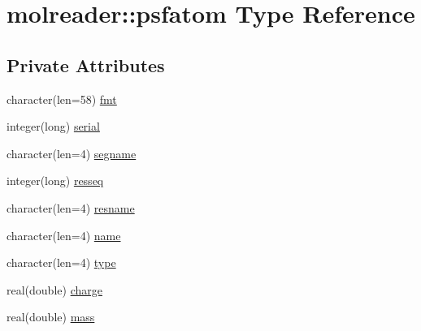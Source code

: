 \hypertarget{structmolreader_1_1psfatom}{\section{molreader\-:\-:psfatom Type Reference}
\label{structmolreader_1_1psfatom}
}
\subsection*{Private Attributes}
\begin{DoxyCompactItemize}
\item 
character(len=58) \hyperlink{structmolreader_1_1psfatom_a2c662eb006fdf85c624b28a08f65cc7b}{fmt}
\item 
integer(long) \hyperlink{structmolreader_1_1psfatom_ab524e29eb9ad1beb802719121a639fa0}{serial}
\item 
character(len=4) \hyperlink{structmolreader_1_1psfatom_aed960b86c5ddd5378e5a849a2732f650}{segname}
\item 
integer(long) \hyperlink{structmolreader_1_1psfatom_abb34c7f3cc664d0e63be1fc695413f7a}{resseq}
\item 
character(len=4) \hyperlink{structmolreader_1_1psfatom_a0bd7d6afb5d4c41d84a1e278d341ec00}{resname}
\item 
character(len=4) \hyperlink{structmolreader_1_1psfatom_a5f7ded307db07f842d21aee2dfca772b}{name}
\item 
character(len=4) \hyperlink{structmolreader_1_1psfatom_a99d2104c1a01026eef2cd329fd546f90}{type}
\item 
real(double) \hyperlink{structmolreader_1_1psfatom_abbebc3b397af2ee56c04933bc3008753}{charge}
\item 
real(double) \hyperlink{structmolreader_1_1psfatom_ae3774dcb1dec79eb1f7d5e26331056bb}{mass}
\end{DoxyCompactItemize}


